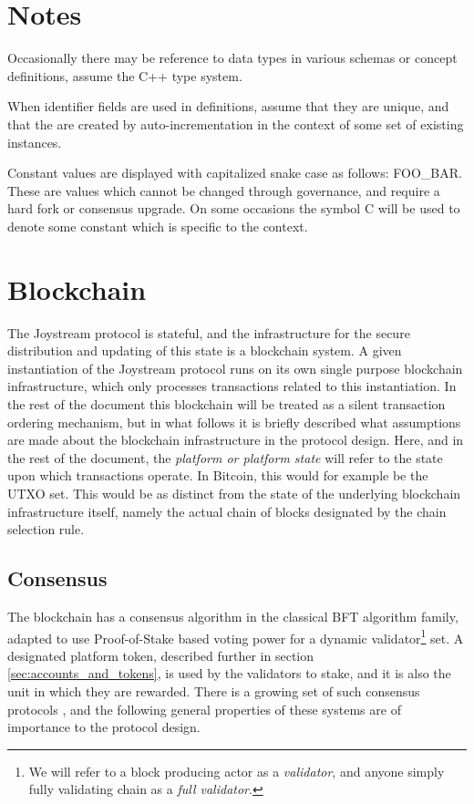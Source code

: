 \documentclass{article}
\begin{document}
\section{Notes}

Occasionally there may be reference to data types in various schemas or concept definitions, assume the C++ type system.

When identifier fields are used in definitions, assume that they are unique, and that the are created by auto-incrementation in the context of some set of existing instances.

Constant values are displayed with capitalized snake case as follows: {\tiny FOO\_BAR}. These are values which cannot be changed through governance, and require a hard fork or consensus upgrade. On some occasions the symbol {\tiny C} will be used to denote some constant which is specific to the context.

\section{Blockchain}

The Joystream protocol is stateful, and the infrastructure for the secure distribution and updating of this state is a blockchain system.
A given instantiation of the Joystream protocol runs on its own single purpose blockchain infrastructure, which only processes transactions related to this instantiation. In the rest of the document this blockchain will be treated as a silent transaction ordering mechanism, but in what follows it is briefly described what assumptions are made about the blockchain infrastructure in the protocol design. Here, and in the rest of the document, the \textit{platform or platform state} will refer to the state upon which transactions operate. In Bitcoin, this would for example be the UTXO set. This would be as distinct from the state of the underlying blockchain infrastructure itself, namely the actual chain of blocks designated by the chain selection rule.

\subsection{Consensus}

The blockchain has a consensus algorithm in the classical BFT algorithm family, adapted to use Proof-of-Stake based voting power for a dynamic validator\footnote{We will refer to a block producing actor as a \textit{validator}, and anyone simply fully validating chain as a \textit{full validator}.} set. A designated platform token, described further in section \ref{sec:accounts_and_tokens}, is used by the validators to stake, and it is also the unit in which they are rewarded. There is a growing set of such consensus protocols \cite{tendermint, kiayias2017ouroboros, algorand}, and the following general properties of these systems are of importance to the protocol design.
\end{document}
